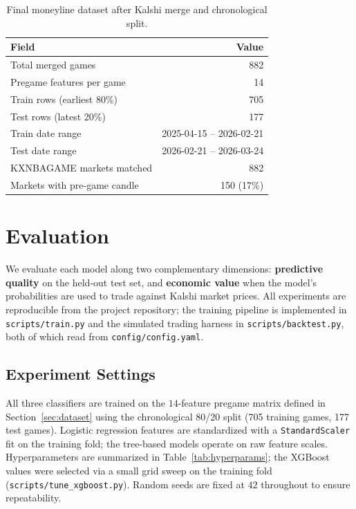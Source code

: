 \begin{table}[h]
\centering
\caption{Final moneyline dataset after Kalshi merge and chronological split.}
\label{tab:dataset}
\begin{tabular}{lr}
\toprule
\textbf{Field} & \textbf{Value} \\
\midrule
Total merged games           & 882 \\
Pregame features per game    & 14 \\
Train rows (earliest 80\%)   & 705 \\
Test rows (latest 20\%)      & 177 \\
Train date range             & 2025-04-15 -- 2026-02-21 \\
Test date range              & 2026-02-21 -- 2026-03-24 \\
KXNBAGAME markets matched    & 882 \\
Markets with pre-game candle & 150 (17\%) \\
\bottomrule
\end{tabular}
\end{table}

\section{Evaluation}
\label{sec:evaluation}

We evaluate each model along two complementary dimensions:
\textbf{predictive quality} on the held-out test set, and
\textbf{economic value} when the model's probabilities are used to
trade against Kalshi market prices. All experiments are reproducible
from the project repository; the training pipeline is implemented in
\texttt{scripts/train.py} and the simulated trading harness in
\texttt{scripts/backtest.py}, both of which read from
\texttt{config/config.yaml}.

\subsection{Experiment Settings}

All three classifiers are trained on the $14$-feature pregame matrix
defined in Section~\ref{sec:dataset} using the chronological 80/20
split (705 training games, 177 test games). Logistic regression
features are standardized with a \texttt{StandardScaler} fit on the
training fold; the tree-based models operate on raw feature scales.
Hyperparameters are summarized in Table~\ref{tab:hyperparams}; the
XGBoost values were selected via a small grid sweep on the training
fold (\texttt{scripts/tune\_xgboost.py}). Random seeds are fixed
at $42$ throughout to ensure repeatability.

